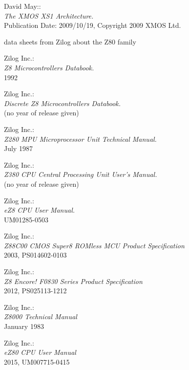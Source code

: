  David May:: \\
               {\em The XMOS XS1 Architecture.\/} \\
               Publication Date: 2009/10/19, Copyright 2009 XMOS Ltd.

 data sheets from Zilog about the Z80 family

 Zilog Inc.: \\
                {\em Z8 Microcontrollers Databook.\/} \\
                1992

 Zilog Inc.: \\
                  {\em Discrete Z8 Microcontrollers Databook.\/} \\
                  (no year of release given)

 Zilog Inc.: \\
                  {\em Z280 MPU Microprocessor Unit Technical Manual.\/} \\
                  July 1987

 Zilog Inc.: \\
                  {\em Z380 CPU Central Processing Unit User's
                  Manual.\/} \\
                  (no year of release given)

 Zilog Inc.: \\
               {\em eZ8 CPU User Manual.\/} \\
               UM01285-0503

 Zilog Inc.: \\
               {\em Z88C00 CMOS Super8 ROMless MCU Product Specification\/} \\
               2003, PS014602-0103

 Zilog Inc.: \\
               {\em Z8 Encore! F0830 Series Product Specification\/} \\
               2012, PS025113-1212

 Zilog Inc.: \\
               {\em Z8000 Technical Manual\/} \\
               January 1983

 Zilog Inc.: \\
               {\em eZ80 CPU User Manual\/} \\
               2015, UM007715-0415

